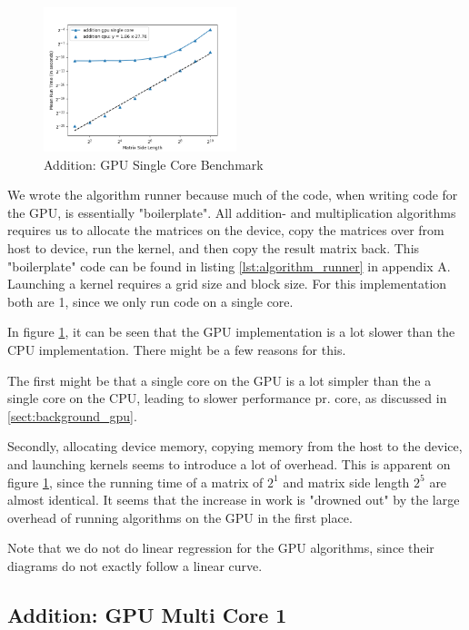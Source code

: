 \begin{figure}
    \centering
    \includegraphics[width=0.5\textwidth]{SavedBenchmarksAndDiagrams/Machine 2/Addition/CPU VS GPU.png}
    \caption{Addition: GPU Single Core Benchmark}
    \label{fig:addition_gpu_sc_bench}
\end{figure}

We wrote the algorithm runner because much of the code, when writing code for the GPU, is essentially "boilerplate". All addition- and multiplication algorithms requires us to allocate the matrices on the device, copy the matrices over from host to device, run the kernel, and then copy the result matrix back. This "boilerplate" code can be found in listing \ref{lst:algorithm_runner} in appendix A. Launching a kernel requires a grid size and block size. For this implementation both are 1, since we only run code on a single core.

In figure \ref{fig:addition_gpu_sc_bench}, it can be seen that the GPU implementation is a lot slower than the CPU implementation. There might be a few reasons for this. 

The first might be that a single core on the GPU is a lot simpler than the a single core on the CPU, leading to slower performance pr. core, as discussed in \ref{sect:background_gpu}.

Secondly, allocating device memory, copying memory from the host to the device, and launching kernels seems to introduce a lot of overhead. This is apparent on figure \ref{fig:addition_gpu_sc_bench}, since the running time of a matrix of $2^1$ and matrix side length $2^5$ are almost identical. It seems that the increase in work is "drowned out" by the large overhead of running algorithms on the GPU in the first place.

Note that we do not do linear regression for the GPU algorithms, since their diagrams do not exactly follow a linear curve.

\subsection{Addition: GPU Multi Core 1}

